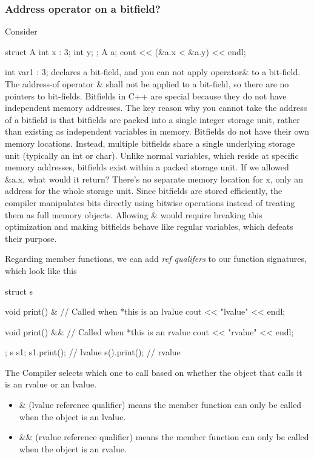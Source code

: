 \documentclass{report}
\begin{document}
\bigbreak \noindent 
\subsubsection{Address operator on a bitfield?}
\bigbreak \noindent 
Consider 
\begin{cppcode}
struct A {
    int x : 3;
    int y;
};
A a;
cout << (&a.x < &a.y) << endl;
\end{cppcode}
\bigbreak \noindent 
int var1 : 3; declares a bit-field, and you can not apply operator\& to a bit-field.
\bigbreak \noindent 
The address-of operator \& shall not be applied to a bit-field, so there are no pointers to bit-fields.
\bigbreak \noindent 
Bitfields in C++ are special because they do not have independent memory addresses. The key reason why you cannot take the address of a bitfield is that bitfields are packed into a single integer storage unit, rather than existing as independent variables in memory.
\bigbreak \noindent 
Bitfields do not have their own memory locations. Instead, multiple bitfields share a single underlying storage unit (typically an int or char).
\bigbreak \noindent 
Unlike normal variables, which reside at specific memory addresses, bitfields exist within a packed storage unit.
\bigbreak \noindent 
If we allowed \&a.x, what would it return? There's no separate memory location for x, only an address for the whole storage unit.
\bigbreak \noindent 
Since bitfields are stored efficiently, the compiler manipulates bits directly using bitwise operations instead of treating them as full memory objects.
\bigbreak \noindent 
Allowing \& would require breaking this optimization and making bitfields behave like regular variables, which defeats their purpose.

\pagebreak 
{}
\bigbreak \noindent 
Regarding member functions, we can add \textit{ref qualifers} to our function signatures, which look like this
\bigbreak \noindent 
\begin{cppcode}
struct s{
    void print() & { // Called when *this is an lvalue
        cout << "lvalue" << endl;
    }

    void print() && { // Called when *this is an rvalue
        cout << "rvalue" << endl;
    }
};
s s1;
s1.print(); // lvalue
s().print(); // rvalue
\end{cppcode}
\bigbreak \noindent 
The Compiler selects which one to call based on whether the object that calls it is an rvalue or an lvalue.
\bigbreak \noindent 
\begin{itemize}
    \item \& (lvalue reference qualifier) means the member function can only be called when the object is an lvalue.
    \item \&\& (rvalue reference qualifier) means the member function can only be called when the object is an rvalue.
\end{itemize}
\end{document}

